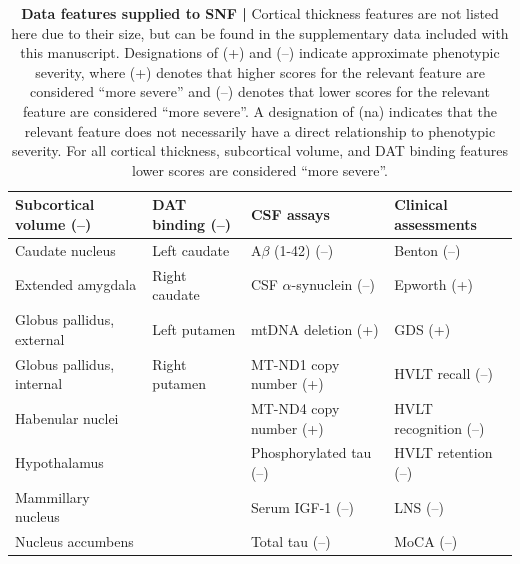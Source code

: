 \documentclass[12pt,aps,pra,reprint,showkeys]{revtex4-1}
\begin{document}
\begin{table}[p]
    \caption{
      \textbf{Data features supplied to SNF |}
      Cortical thickness features are not listed here due to their size, but can be found in the supplementary data included with this manuscript.
      Designations of (+) and (--) indicate approximate phenotypic severity, where (+) denotes that higher scores for the relevant feature are considered ``more severe'' and (--) denotes that lower scores for the relevant feature are considered ``more severe''.
      A designation of (na) indicates that the relevant feature does not necessarily have a direct relationship to phenotypic severity.
      For all cortical thickness, subcortical volume, and DAT binding features lower scores are considered ``more severe''.
    }
    \label{supp-table-snf-features}
    \setlength{\tabcolsep}{9pt}
    \renewcommand{\arraystretch}{1.1}
    \begin{center}
      \begin{tabular}{l l l l}
                                                                                                                                      \toprule
        \textbf{Subcortical volume (--)} & \textbf{DAT binding (--)} &         \textbf{CSF assays} & \textbf{Clinical assessments} \\ \midrule
                         Caudate nucleus &              Left caudate &        A$\beta$ (1-42) (--) &                   Benton (--) \\
                       Extended amygdala &             Right caudate & CSF $\alpha$-synuclein (--) &                   Epworth (+) \\
               Globus pallidus, external &              Left putamen &          mtDNA deletion (+) &                       GDS (+) \\
               Globus pallidus, internal &             Right putamen &      MT-ND1 copy number (+) &              HVLT recall (--) \\
                        Habenular nuclei &                           &      MT-ND4 copy number (+) &         HVLT recognition (--) \\
                            Hypothalamus &                           &     Phosphorylated tau (--) &           HVLT retention (--) \\
                      Mammillary nucleus &                           &            Serum IGF-1 (--) &                      LNS (--) \\
                       Nucleus accumbens &                           &              Total tau (--) &                     MoCA (--) \\

\end{tabular}
\end{center}
\end{table}
\end{document}
